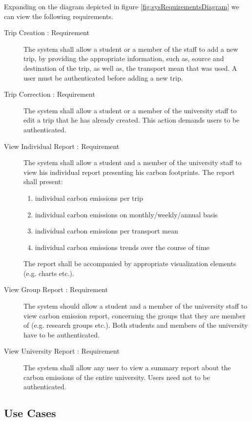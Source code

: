 Expanding on the diagram depicted in figure \ref{fig:sysRequirementsDiagram} we can view the following requirements.

\begin{description}
  \item[Trip Creation : Requirement]
        The system shall allow a student or a member of the staff to add a new trip, by providing the appropriate information, such as, source and destination of the trip, as well as, the transport mean that was used. A user must be authenticated before adding a new trip.
  \item[Trip Correction : Requirement]
        The system shall allow a student or a member of the university staff to edit a trip that he has already created. This action demands users to be authenticated.
  \item[ View Individual Report : Requirement]
        The system shall allow a student and a member of the university staff to view his individual report presenting his carbon footprints. The report shall present:

        \begin{enumerate}
          \item individual carbon emissions per trip
          \item individual carbon emissions on monthly/weekly/annual basis
          \item individual carbon emissions per transport mean
          \item individual carbon emissions trends over the course of time
        \end{enumerate}

        The report shall be accompanied by appropriate visualization elements (e.g. charts etc.).
  \item[View Group Report : Requirement]
        The system should allow a student and a member of the university staff to view carbon emission report, concerning the groups that they are member of (e.g. research groups etc.).
        Both students and members of the university have to be authenticated.
  \item[View University Report : Requirement]
        The system shall allow any user to view a summary report about the carbon emissions of the entire university.
        Users need not to be authenticated.
\end{description}


\subsection{Use Cases}

